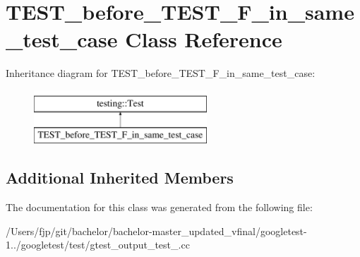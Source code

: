 \hypertarget{class_t_e_s_t__before___t_e_s_t___f__in__same__test__case}{}\section{T\+E\+S\+T\+\_\+before\+\_\+\+T\+E\+S\+T\+\_\+\+F\+\_\+in\+\_\+same\+\_\+test\+\_\+case Class Reference}
\label{class_t_e_s_t__before___t_e_s_t___f__in__same__test__case}
Inheritance diagram for T\+E\+S\+T\+\_\+before\+\_\+\+T\+E\+S\+T\+\_\+\+F\+\_\+in\+\_\+same\+\_\+test\+\_\+case\+:\begin{figure}[H]
\begin{center}
\leavevmode
\includegraphics[height=2.000000cm]{class_t_e_s_t__before___t_e_s_t___f__in__same__test__case}
\end{center}
\end{figure}
\subsection*{Additional Inherited Members}


The documentation for this class was generated from the following file\+:\begin{DoxyCompactItemize}
\item 
/\+Users/fjp/git/bachelor/bachelor-\/master\+\_\+updated\+\_\+vfinal/googletest-\/1../googletest/test/gtest\+\_\+output\+\_\+test\+\_\+.\+cc\end{DoxyCompactItemize}
